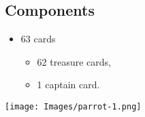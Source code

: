 \begin{multicols}{2}
\section*{Components}
\begin{itemize}[leftmargin=*, nosep]
\item 63 cards
\begin{itemize}[leftmargin=*, nosep]
\item 62 treasure cards,
\item 1 captain card.
\end{itemize}
\end{itemize}
\vfill{}\null

\begin{center}
\texttt{[image: Images/parrot-1.png]}
\end{center}
\end{multicols}